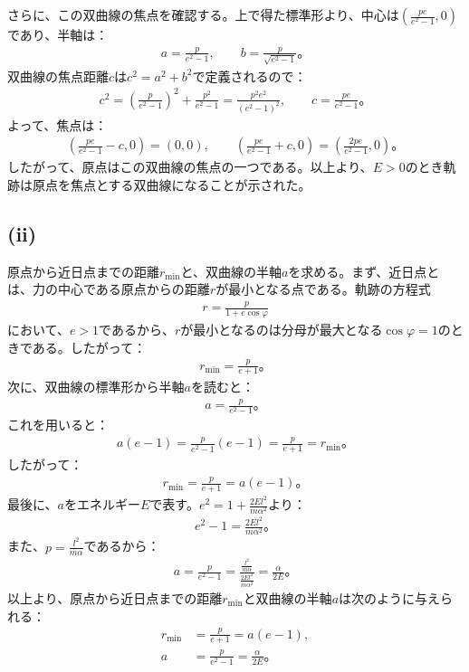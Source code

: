   さらに、この双曲線の焦点を確認する。上で得た標準形より、中心は$\left(\frac{pe}{e^2-1},0\right)$であり、半軸は：
  \begin{align*}
    a=\frac{p}{e^2-1},\qquad b=\frac{p}{\sqrt{e^2-1}}。
  \end{align*}
  双曲線の焦点距離$c$は$c^2=a^2+b^2$で定義されるので：
  \begin{align*}
    c^2=\left(\frac{p}{e^2-1}\right)^2+\frac{p^2}{e^2-1}=\frac{p^2e^2}{(e^2-1)^2},\qquad c=\frac{pe}{e^2-1}。
  \end{align*}
  よって、焦点は：
  \begin{align*}
    \left(\frac{pe}{e^2-1}-c,0\right)=(0,0),\qquad \left(\frac{pe}{e^2-1}+c,0\right)=\left(\frac{2pe}{e^2-1},0\right)。
  \end{align*}
  したがって、原点はこの双曲線の焦点の一つである。以上より、$E>0$のとき軌跡は原点を焦点とする双曲線になることが示された。

  \subsection*{(ii)}
  原点から近日点までの距離$r_{\min}$と、双曲線の半軸$a$を求める。まず、近日点とは、力の中心である原点からの距離$r$が最小となる点である。軌跡の方程式
  \begin{align*}
    r=\frac{p}{1+e\cos\varphi}
  \end{align*}
  において、$e>1$であるから、$r$が最小となるのは分母が最大となる$\cos\varphi=1$のときである。したがって：
  \begin{align*}
    r_{\min}=\frac{p}{e+1}。
  \end{align*}
  次に、双曲線の標準形から半軸$a$を読むと：
  \begin{align*}
    a=\frac{p}{e^2-1}。
  \end{align*}
  これを用いると：
  \begin{align*}
    a(e-1)=\frac{p}{e^2-1}(e-1)=\frac{p}{e+1}=r_{\min}。
  \end{align*}
  したがって：
  \begin{align*}
    r_{\min}=\frac{p}{e+1}=a(e-1)。
  \end{align*}
  最後に、$a$をエネルギー$E$で表す。$e^2=1+\frac{2El^2}{m\alpha^2}$より：
  \begin{align*}
    e^2-1=\frac{2El^2}{m\alpha^2}。
  \end{align*}
  また、$p=\frac{l^2}{m\alpha}$であるから：
  \begin{align*}
    a=\frac{p}{e^2-1}=\frac{\frac{l^2}{m\alpha}}{\frac{2El^2}{m\alpha^2}}=\frac{\alpha}{2E}。
  \end{align*}
  以上より、原点から近日点までの距離$r_{\min}$と双曲線の半軸$a$は次のように与えられる：
  \begin{align*}
    r_{\min}&=\frac{p}{e+1}=a(e-1),\tag{41}\\
    a&=\frac{p}{e^2-1}=\frac{\alpha}{2E}\tag{42}。
  \end{align*}

